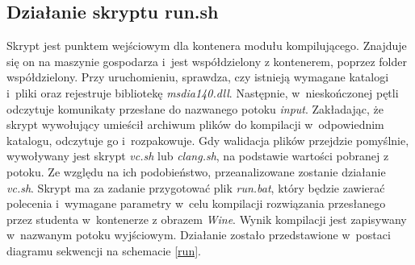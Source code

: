 \subsection{Działanie skryptu run.sh}
Skrypt jest punktem wejściowym dla kontenera modułu kompilującego. Znajduje się on na maszynie gospodarza i~jest współdzielony z kontenerem, poprzez folder współdzielony. Przy uruchomieniu, sprawdza, czy istnieją wymagane katalogi i~pliki oraz rejestruje bibliotekę \textit{msdia140.dll}. Następnie, w~nieskończonej pętli odczytuje komunikaty przesłane do nazwanego potoku \textit{input}. Zakładając, że skrypt wywołujący umieścił archiwum plików do kompilacji w~odpowiednim katalogu, odczytuje go i~rozpakowuje. Gdy walidacja plików przejdzie pomyślnie, wywoływany jest skrypt \textit{vc.sh} lub \textit{clang.sh}, na podstawie wartości pobranej z potoku. Ze względu na ich podobieństwo, przeanalizowane zostanie działanie \textit{vc.sh}. Skrypt ma za zadanie przygotować plik \textit{run.bat}, który będzie zawierać polecenia i~wymagane parametry w~celu kompilacji rozwiązania przesłanego przez studenta w~kontenerze z obrazem \textit{Wine}. Wynik kompilacji jest zapisywany w~nazwanym potoku wyjściowym. Działanie zostało przedstawione w~postaci diagramu sekwencji na schemacie \ref{run}.
